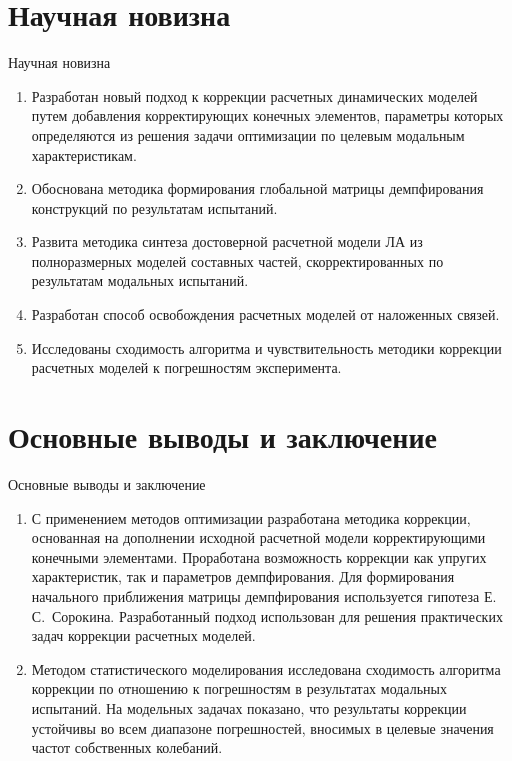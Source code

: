 
\section{Научная новизна}

\begin{frame}{Научная новизна}
	\begin{enumerate}
		\item Разработан новый подход к коррекции расчетных динамических моделей путем добавления корректирующих конечных элементов, параметры которых определяются из решения задачи оптимизации по целевым модальным характеристикам.
		\item Обоснована методика формирования глобальной матрицы демпфирования конструкций по результатам испытаний.
		\item Развита методика синтеза достоверной расчетной модели ЛА из полноразмерных моделей составных частей, скорректированных по результатам модальных испытаний.
		\item Разработан способ освобождения расчетных моделей от наложенных связей.
		\item Исследованы сходимость алгоритма и чувствительность методики коррекции расчетных моделей к погрешностям эксперимента. 
	\end{enumerate}
\end{frame}

\section{Основные выводы и заключение}

\begin{frame}{Основные выводы и заключение}
	\begin{enumerate}
		\item С применением методов оптимизации разработана методика коррекции, основанная на дополнении исходной расчетной модели корректирующими конечными элементами. Проработана возможность коррекции как упругих характеристик, так и параметров демпфирования. Для формирования начального приближения матрицы демпфирования используется гипотеза Е.\,С.~Сорокина. Разработанный подход использован для решения практических задач коррекции  расчетных моделей.
		\item Методом статистического моделирования исследована сходимость алгоритма коррекции по отношению к погрешностям в результатах модальных испытаний. На модельных задачах показано, что результаты коррекции устойчивы во всем диапазоне погрешностей, вносимых в целевые значения частот собственных колебаний.
	\end{enumerate}
\end{frame}


